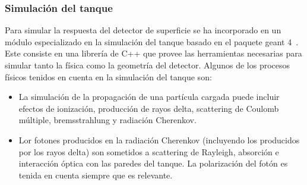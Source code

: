 		
		
		\subsubsection{Simulaci\'on del tanque}
		
		Para simular la respuesta del detector de superficie se ha incorporado en \Offline{} un m\'odulo especializado en la simulaci\'on del tanque basado en el paquete {\sc geant 4}~\cite{geant4}. 
		Este consiste en una librer\'ia de C++ que provee las herramientas necesarias para simular tanto la f\'isica como la geometr\'ia del detector.
		Algunos de los procesos f\'isicos tenidos en cuenta en la simulaci\'on del tanque son:
		\begin{itemize}
		\item La simulaci\'on de la propagaci\'on de una part\'icula cargada puede incluir efectos de ionizaci\'on, producci\'on de rayos delta, scattering de Coulomb múltiple, bremsstrahlung y radiaci\'on Cherenkov.
		\item Lor fotones producidos en la radiaci\'on Cherenkov (incluyendo los producidos por los rayos delta) son sometidos a scattering de Rayleigh, absorci\'on e interacci\'on \'optica con las paredes del tanque. La polarizaci\'on del fot\'on es tenida en cuenta siempre que es relevante.
		\end{itemize}
